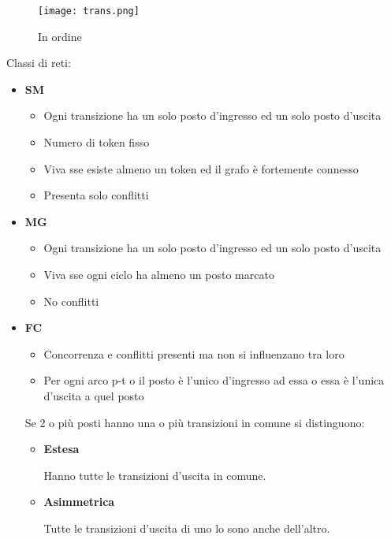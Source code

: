 \documentclass{article}
\begin{document}
\begin{figure}[ht]
    \centering
    \texttt{[image: trans.png]}
    \caption{In ordine}
\end{figure}

\newpage

\noindent Classi di reti:
\begin{itemize}
    \item \textbf{SM}
        \begin{itemize}
            \item Ogni transizione ha un solo posto d'ingresso ed un solo posto d'uscita
            \item Numero di token fisso
            \item Viva sse esiste almeno un token ed il grafo è fortemente connesso
            \item Presenta solo conflitti
        \end{itemize}
    \item \textbf{MG}
        \begin{itemize}
            \item Ogni transizione ha un solo posto d'ingresso ed un solo posto d'uscita
            \item Viva sse ogni ciclo ha almeno un posto marcato
            \item No conflitti
        \end{itemize}
    \item \textbf{FC}
        \begin{itemize}
            \item Concorrenza e conflitti presenti ma non si influenzano tra loro
            \item Per ogni arco p-t o il posto è l'unico d'ingresso ad essa o essa è l'unica d'uscita a quel posto 
        \end{itemize}

        Se 2 o più posti hanno una o più transizioni in comune si distinguono:
            \begin{itemize}
                \item \textbf{Estesa}

                    Hanno tutte le transizioni d'uscita in comune.
                
                \item \textbf{Asimmetrica}

                    Tutte le transizioni d'uscita di uno lo sono anche dell'altro.\newline
                
            \end{itemize}
        
\end{itemize}
\end{document}
